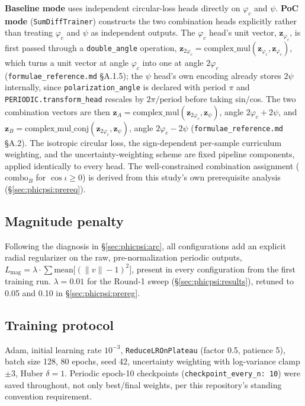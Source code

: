\textbf{Baseline mode} uses independent circular-loss heads directly on $\varphi_c$ and $\psi$.
\textbf{PoC mode} (\texttt{SumDiffTrainer}) constructs the two combination heads explicitly rather than treating $\varphi_c$ and $\psi$ as independent outputs.
The $\varphi_c$ head's unit vector, $\mathbf{z}_{\varphi_c}$, is first passed through a \texttt{double\_angle} operation, $\mathbf{z}_{2\varphi_c} = \text{complex\_mul}(\mathbf{z}_{\varphi_c}, \mathbf{z}_{\varphi_c})$, which turns a unit vector at angle $\varphi_c$ into one at angle $2\varphi_c$ (\texttt{formulae\_reference.md} \S A.1.5); the $\psi$ head's own encoding already stores $2\psi$ internally, since \texttt{polarization\_angle} is declared with period $\pi$ and \texttt{PERIODIC.transform\_head} rescales by $2\pi/\text{period}$ before taking sin/cos.
The two combination vectors are then $\mathbf{z}_A = \text{complex\_mul}(\mathbf{z}_{2\varphi_c}, \mathbf{z}_\psi)$, angle $2\varphi_c + 2\psi$, and $\mathbf{z}_B = \text{complex\_mul\_conj}(\mathbf{z}_{2\varphi_c}, \mathbf{z}_\psi)$, angle $2\varphi_c - 2\psi$ (\texttt{formulae\_reference.md} \S A.2).
The isotropic circular loss, the sign-dependent per-sample curriculum weighting, and the uncertainty-weighting scheme are fixed pipeline components, applied identically to every head.
The well-constrained combination assignment ($\text{combo}_B$ for $\cos\iota\geq0$) is derived from this study's own prerequisite analysis (\S\ref{sec:phicpsi:prereq}).

\subsection{Magnitude penalty}
\label{sec:phicpsi:penalty}

Following the diagnosis in \S\ref{sec:phicpsi:arc}, all configurations add an explicit radial regularizer on the raw, pre-normalization periodic outputs, $L_{\text{mag}} = \lambda \cdot \sum \text{mean}\bigl[(\|v\|-1)^2\bigr]$, present in every configuration from the first training run.
$\lambda = 0.01$ for the Round-1 sweep (\S\ref{sec:phicpsi:results}), retuned to 0.05 and 0.10 in \S\ref{sec:phicpsi:prereg}.

\subsection{Training protocol}
\label{sec:phicpsi:protocol}

Adam, initial learning rate $10^{-3}$, \texttt{ReduceLROnPlateau} (factor 0.5, patience 5), batch size 128, 80 epochs, seed 42, uncertainty weighting with log-variance clamp $\pm 3$, Huber $\delta=1$.
Periodic epoch-10 checkpoints (\texttt{checkpoint\_every\_n: 10}) were saved throughout, not only best/final weights, per this repository's standing convention requirement.

